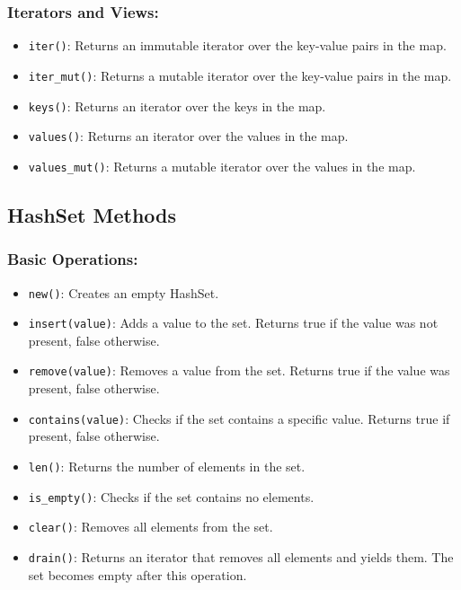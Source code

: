 \documentclass[
  11pt,
]{article}
\providecommand{\tightlist}{%
  \setlength{\itemsep}{0pt}\setlength{\parskip}{0pt}}
\begin{document}
\subsubsection{Iterators and Views:}\label{iterators-and-views}

\begin{itemize}
\tightlist
\item
  \texttt{iter()}: Returns an immutable iterator over the key-value
  pairs in the map.
\item
  \texttt{iter\_mut()}: Returns a mutable iterator over the key-value
  pairs in the map.
\item
  \texttt{keys()}: Returns an iterator over the keys in the map.
\item
  \texttt{values()}: Returns an iterator over the values in the map.
\item
  \texttt{values\_mut()}: Returns a mutable iterator over the values in
  the map.
\end{itemize}

\subsection{HashSet Methods}\label{hashset-methods}

\subsubsection{Basic Operations:}\label{basic-operations-1}

\begin{itemize}
\tightlist
\item
  \texttt{new()}: Creates an empty HashSet.
\item
  \texttt{insert(value)}: Adds a value to the set. Returns true if the
  value was not present, false otherwise.
\item
  \texttt{remove(value)}: Removes a value from the set. Returns true if
  the value was present, false otherwise.
\item
  \texttt{contains(value)}: Checks if the set contains a specific value.
  Returns true if present, false otherwise.
\item
  \texttt{len()}: Returns the number of elements in the set.
\item
  \texttt{is\_empty()}: Checks if the set contains no elements.
\item
  \texttt{clear()}: Removes all elements from the set.
\item
  \texttt{drain()}: Returns an iterator that removes all elements and
  yields them. The set becomes empty after this operation.
\end{itemize}
\end{document}
